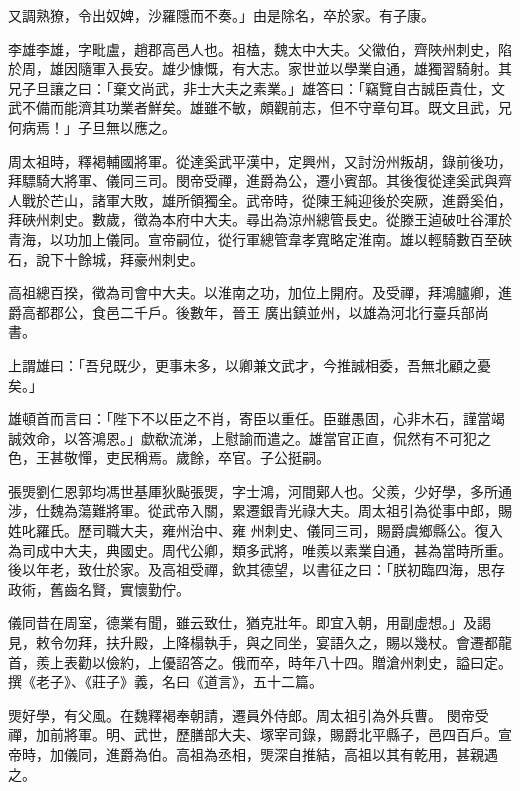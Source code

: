 \begin{pinyinscope}
 又調熟獠，令出奴婢，沙羅隱而不奏。」由是除名，卒於家。有子康。



 李雄李雄，字毗盧，趙郡高邑人也。祖榼，魏太中大夫。父徽伯，齊陜州刺史，陷於周，雄因隨軍入長安。雄少慷慨，有大志。家世並以學業自通，雄獨習騎射。其兄子旦讓之曰：「棄文尚武，非士大夫之素業。」雄答曰：「竊覽自古誠臣貴仕，文武不備而能濟其功業者鮮矣。雄雖不敏，頗觀前志，但不守章句耳。既文且武，兄何病焉！」子旦無以應之。



 周太祖時，釋褐輔國將軍。從達奚武平漢中，定興州，又討汾州叛胡，錄前後功，拜驃騎大將軍、儀同三司。閔帝受禪，進爵為公，遷小賓部。其後復從達奚武與齊人戰於芒山，諸軍大敗，雄所領獨全。武帝時，從陳王純迎後於突厥，進爵奚伯，拜硤州刺史。數歲，徵為本府中大夫。尋出為涼州總管長史。從滕王逌破吐谷渾於青海，以功加上儀同。宣帝嗣位，從行軍總管韋孝寬略定淮南。雄以輕騎數百至硤石，說下十餘城，拜豪州刺史。



 高祖總百揆，徵為司會中大夫。以淮南之功，加位上開府。及受禪，拜鴻臚卿，進爵高都郡公，食邑二千戶。後數年，晉王
 廣出鎮並州，以雄為河北行臺兵部尚書。



 上謂雄曰：「吾兒既少，更事未多，以卿兼文武才，今推誠相委，吾無北顧之憂矣。」



 雄頓首而言曰：「陛下不以臣之不肖，寄臣以重任。臣雖愚固，心非木石，謹當竭誠效命，以答鴻恩。」歔欷流涕，上慰諭而遣之。雄當官正直，侃然有不可犯之色，王甚敬憚，吏民稱焉。歲餘，卒官。子公挺嗣。



 張煚劉仁恩郭均馮世基厙狄颭張煚，字士鴻，河間鄚人也。父羨，少好學，多所通涉，仕魏為蕩難將軍。從武帝入關，累遷銀青光祿大夫。周太祖引為從事中郎，賜姓叱羅氏。歷司職大夫，雍州治中、雍
 州刺史、儀同三司，賜爵虞鄉縣公。復入為司成中大夫，典國史。周代公卿，類多武將，唯羨以素業自通，甚為當時所重。後以年老，致仕於家。及高祖受禪，欽其德望，以書征之曰：「朕初臨四海，思存政術，舊齒名賢，實懷勤佇。



 儀同昔在周室，德業有聞，雖云致仕，猶克壯年。即宜入朝，用副虛想。」及謁見，敕令勿拜，扶升殿，上降榻執手，與之同坐，宴語久之，賜以幾杖。會遷都龍首，羨上表勸以儉約，上優詔答之。俄而卒，時年八十四。贈滄州刺史，謚曰定。撰《老子》、《莊子》義，名曰《道言》，五十二篇。



 煚好學，有父風。在魏釋褐奉朝請，遷員外侍郎。周太祖引為外兵曹。
 閔帝受禪，加前將軍。明、武世，歷膳部大夫、塚宰司錄，賜爵北平縣子，邑四百戶。宣帝時，加儀同，進爵為伯。高祖為丞相，煚深自推結，高祖以其有乾用，甚親遇之。




\end{pinyinscope}
